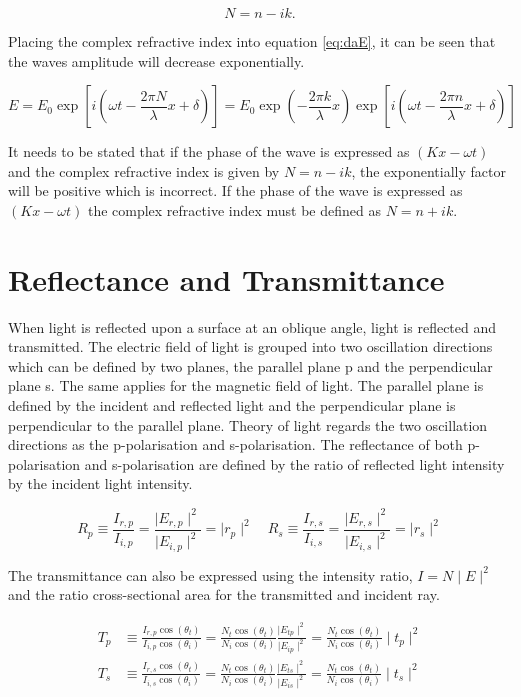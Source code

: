 \documentclass[MasterThesisMain.tex]{subfiles}
\begin{document}
\begin{equation}
N=n-ik.
\end{equation}

Placing the complex refractive index into equation \ref{eq:daE}, it can be seen that the waves amplitude will decrease exponentially.

\begin{equation}
E = E_0\exp[i(\omega t - \frac{2\pi N}{\lambda}x + \delta)] = E_0\exp(-\frac{2\pi k}{\lambda}x)\exp[i(\omega t - \frac{2\pi n}{\lambda}x + \delta)]
\end{equation}

It needs to be stated that if the phase of the wave is expressed as $(Kx-\omega t)$ and the complex refractive index is given by $N=n-ik$, the exponentially factor will be positive which is incorrect. If the phase of the wave is expressed as $(Kx-\omega t)$ the complex refractive index must be defined as $N=n+ik$.

\section{Reflectance and Transmittance}\label{ch:reflect/trans}
When light is reflected upon a surface at an oblique angle, light is reflected and transmitted. The electric field of light is grouped into two oscillation directions which can be defined by two planes, the parallel plane p and the perpendicular plane s. The same applies for the magnetic field of light. The parallel plane is defined by the incident and reflected light and the perpendicular plane is perpendicular to the parallel plane. Theory of light regards the two oscillation directions as the p-polarisation and s-polarisation. The reflectance of both p-polarisation and s-polarisation are defined by the ratio of reflected light intensity by the incident light intensity.

\begin{equation}
R_{p} \equiv \frac{I_{r,p}}{I_{i,p}} = \frac{\mid E_{r,p} \mid^2}{\mid E_{i,p} \mid^2} = \mid r_{p} \mid^2 \quad R_{s} \equiv \frac{I_{r,s}}{I_{i,s}} = \frac{\mid E_{r,s} \mid^2}{\mid E_{i,s} \mid^2} = \mid r_{s} \mid^2
\end{equation}

The transmittance can also be expressed using the intensity ratio, $I = N \mid E \mid^2$ and the ratio cross-sectional area for the transmitted and incident ray.

\begin{align}
T_p &\equiv \frac{I_{r,p}\cos(\theta_t)}{I_{i,p}\cos(\theta_i)} = \frac{N_t\cos(\theta_t)}{N_i\cos(\theta_i)}\frac{\mid E_{tp} \mid^2}{\mid E_{ip} \mid^2} = \frac{N_t\cos(\theta_t)}{N_i\cos(\theta_i)} \mid t_{p} \mid^2\\
T_s &\equiv \frac{I_{r,s}\cos(\theta_t)}{I_{i,s}\cos(\theta_i)} = \frac{N_t\cos(\theta_t)}{N_i\cos(\theta_i)}\frac{\mid E_{ts} \mid^2}{\mid E_{is} \mid^2} = \frac{N_t\cos(\theta_t)}{N_i\cos(\theta_i)} \mid t_{s} \mid^2\\
\end{align}
\end{document}
